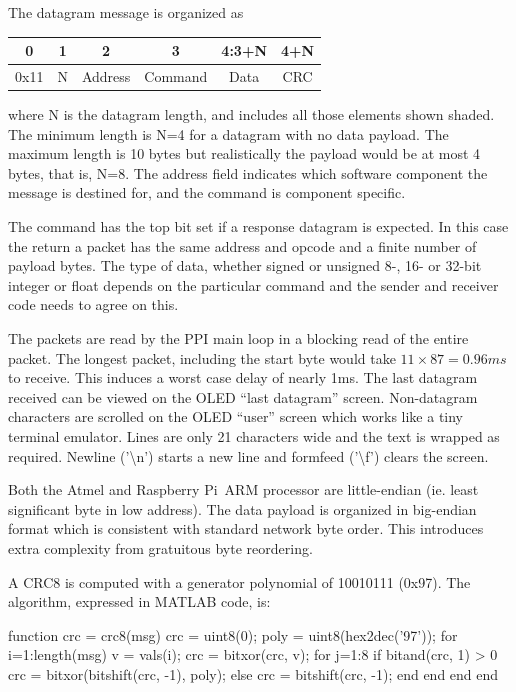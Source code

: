 \documentclass[11pt,fleqn]{article}
\newcommand{\rpi}{Raspberry Pi}
\begin{document}
The datagram message is organized as

\begin{table}[h]
\centering
\begin{tabular}{|c|c|c|c|c|c|}\hline
0 & 1 & 2 & 3 & 4:3+N & 4+N \\ \hline
0x11 & \cellcolor[gray]{0.8} N &  \cellcolor[gray]{0.8}Address &  \cellcolor[gray]{0.8}Command &  \cellcolor[gray]{0.8}Data &  \cellcolor[gray]{0.8}CRC \\ \hline
\end{tabular}
\end{table}

where N is the datagram length, and includes all those elements shown shaded. The minimum length is N=4 for a datagram with no data payload.
The maximum length is 10 bytes but realistically the payload would be at most 4 bytes, that is, N=8. 
The address field indicates which software component the message is destined for, and the command is component specific. 

The command has the top bit set if a response datagram is expected. In this case the return a packet has the same address and opcode and  a finite number of payload bytes.
The type of data, whether signed or unsigned 8-, 16- or 32-bit integer or float depends on the particular command and the sender and receiver code needs to agree on this.
 
The packets are read by the PPI main loop in a blocking read of the entire packet.  The longest packet, including the start byte would take $11 \times 87 = 0.96\unit{ms}$ to receive.
This induces a worst case delay of nearly 1\unit{ms}.
The last datagram received can be viewed on the OLED ``last datagram'' screen.
Non-datagram characters are scrolled on the OLED ``user'' screen which works like a tiny terminal emulator.  Lines are only 21 characters wide and the text is wrapped as required.  Newline ('\textbackslash n') starts a new line and formfeed ('\textbackslash f') clears the screen.

Both the Atmel and \rpi\ ARM processor are little-endian (ie. least significant byte in low address).  The data payload is organized in 
big-endian format which is consistent with standard network byte order.
This introduces extra complexity from gratuitous byte reordering.

A CRC8  is computed with a generator polynomial of 10010111 (0x97).  The algorithm, expressed in MATLAB code, is:
\begin{Code}
        function crc = crc8(msg)
            crc = uint8(0);
            poly = uint8(hex2dec('97'));
            for i=1:length(msg)
                v = vals(i);
                crc = bitxor(crc, v);
                for j=1:8
                    if bitand(crc, 1) > 0
                        crc = bitxor(bitshift(crc, -1), poly);
                    else
                        crc = bitshift(crc, -1);
                    end
                end
            end
        end
\end{Code}
\end{document}
